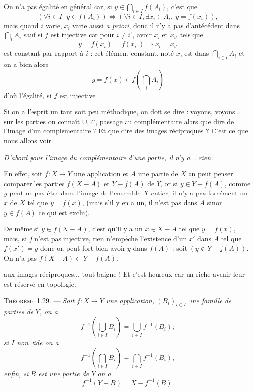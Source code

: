 On n'a pas égalité en général car, si $y\in\bigcap_{i\in I}f(A_i)$, c'est que
\[
(\forall i\in I,\ y\in f(A_i))\Leftrightarrow(\forall i\in I,\exists x_i\in A_i,\ y=f(x_i)),
\]
mais quand $i$ varie, $x_i$ varie aussi \emph{a priori}, donc il n'y a pas d'antécédent dans $\bigcap_iA_i$ sauf si $f$ est injective car pour $i\ne i'$, avoir $x_i$ et $x_{i'}$ tels que
\[
y=f(x_i)=f(x_{i'})\Rightarrow x_i=x_{i'}
\]
est constant par rapport à $i$ : cet élément constant, noté $x$, est dans $\bigcap_{i\in I}A_i$ et on a bien alors
\[
y=f(x)\in f\left(\bigcap_iA_i\right)
\]
d'où l'égalité, si $f$ est injective.

Si on a l'esprit un tant soit peu méthodique, on doit se dire : voyons, voyons... sur les parties on connaît $\cup$, $\cap$, passage au complémentaire alors que dire de l'image d'un complémentaire ? Et que dire des images réciproques ? C'est ce que nous allons voir.

\emph{D'abord pour l'image du complémentaire d'une partie, il n'y a... rien.}

En effet, soit $f:X\to Y$ une application et $A$ une partie de $X$ on peut penser comparer les parties $f(X-A)$ et $Y-f(A)$ de $Y$, or si $y\in Y-f(A)$, comme $y$ peut ne pas être dans l'image de l'ensemble $X$ entier, il n'y a pas forcément un $x$ de $X$ tel que $y=f(x)$, (mais s'il y en a un, il n'est pas dans $A$ sinon $y\in f(A)$ ce qui est exclu).

De même si $y\in f(X-A)$, c'est qu'il y a un $x\in X-A$ tel que $y=f(x)$, mais, si $f$ n'est pas injective, rien n'empêche l'existence d'un $x'$ dans $A$ tel que $f(x')=y$ donc on peut fort bien avoir $y$ dans $f(A)$ : soit $(y\notin Y-f(A))$. On n'a pas $f(X-A)\subset Y-f(A)$.

 aux images réciproques... tout baigne ! Et c'est heureux car un riche avenir leur est réservé en topologie.

\medskip\noindent\textsc{Théorème 1.29.} --- \emph{Soit $f:X\to Y$ une application, $(B_i)_{i\in I}$ une famille de parties de $Y$, on a}
\[
f^{-1}\left(\bigcup_{i\in I}B_i\right)=\bigcup_{i\in I}f^{-1}(B_i);
\]
\emph{si $I$ non vide on a}
\[
f^{-1}\left(\bigcap_{i\in I}B_i\right)=\bigcap_{i\in I}f^{-1}(B_i),
\]
\emph{enfin, si $B$ est une partie de $Y$ on a}
\[
f^{-1}(Y-B)=X-f^{-1}(B).
\]

